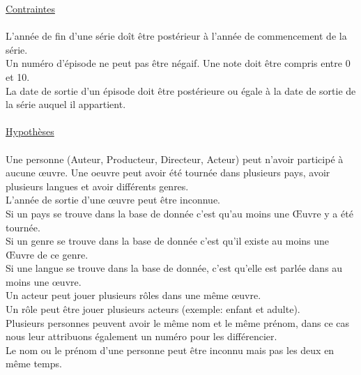\documentclass[10pt,a4paper]{article}
\begin{document}
\noindent\underline{Contraintes}
\\ \\ L'année de fin d'une série doît être postérieur à l'année de commencement de la série. \\ Un numéro d’épisode ne peut pas être négaif. Une note doit être compris entre 0 et 10. \\
La date de sortie d’un épisode doit être postérieure ou égale à la date de sortie de la série auquel il appartient.
\\
\\
\noindent\underline{Hypothèses}
\\ \\ Une personne (Auteur, Producteur, Directeur, Acteur) peut n’avoir participé à aucune œuvre.
Une oeuvre peut avoir été tournée dans plusieurs pays, avoir plusieurs langues et avoir différents genres.\\
L’année de sortie d’une œuvre peut être inconnue. \\
Si un pays se trouve dans la base de donnée c’est qu’au moins une Œuvre y a été tournée. \\
Si un genre se trouve dans la base de donnée c’est qu’il existe au moins une Œuvre de ce genre. \\
Si une langue se trouve dans la base de donnée, c’est qu’elle est parlée dans au moins une œuvre. \\
Un acteur peut jouer plusieurs rôles dans une même œuvre. \\
Un rôle peut être jouer plusieurs acteurs (exemple: enfant et adulte). \\
Plusieurs personnes peuvent avoir le même nom et le même prénom, dans ce cas nous leur attribuons également un numéro pour les différencier.\\
Le nom ou le prénom d’une personne peut être inconnu mais pas les deux en même temps.
\end{document}
